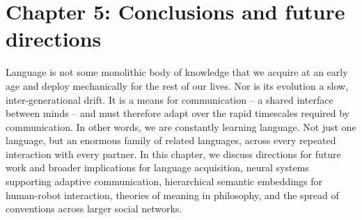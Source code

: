 \documentclass[12pt, donotrepeattitle, man, floatsintext]{apa6}
\begin{document}
\vspace{1cm}
\noindent{}


\section{Chapter 5: Conclusions and future directions}

Language is not some monolithic body of knowledge that we acquire at an early age and deploy mechanically for the rest of our lives. Nor is its evolution a slow, inter-generational drift. It is a means for communication -- a shared interface between minds -- and must therefore adapt over the rapid timescales required by communication. In other words, we are constantly learning language. Not just one language, but an enormous family of related languages, across every repeated interaction with every partner. In this chapter, we discuss directions for future work and broader implications for language acquisition,  neural systems supporting adaptive communication, hierarchical semantic embeddings for human-robot interaction, theories of meaning in philosophy, and the spread of conventions across larger social networks.

\vspace{1cm}
\noindent{}%



\small
\singlespacing


\end{document}
